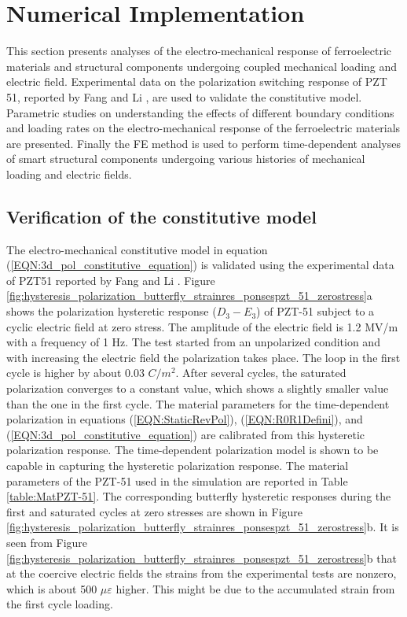 \section{Numerical Implementation}
This section presents analyses of the electro-mechanical response of ferroelectric materials and structural components undergoing coupled mechanical loading and electric field. 
Experimental data on the polarization switching response of PZT 51, reported by Fang and Li \cite{Li2004959}, are used to validate the constitutive model. 
Parametric studies on understanding the effects of different boundary conditions and loading rates on the electro-mechanical response of the ferroelectric materials are presented. 
Finally the FE method is used to perform time-dependent analyses of smart structural components undergoing various histories of mechanical loading and electric fields.

\subsection{Verification of the constitutive model} 
The electro-mechanical constitutive model in equation (\ref{EQN:3d_pol_constitutive_equation}) is validated using the experimental data of PZT51 reported by Fang and Li \cite{Li2004959}. 
Figure \ref{fig:hysteresis_polarization_butterfly_strainres_ponsespzt_51_zerostress}a shows the polarization hysteretic response ($D_3-E_3$) of PZT-51 subject to a cyclic electric field at zero stress. 
The amplitude of the electric field is 1.2 MV/m with a frequency of 1 Hz. 
The test started from an unpolarized condition and with increasing the electric field the polarization takes place. 
The loop in the first cycle is higher by about 0.03 $C/m^2$. 
After several cycles, the saturated polarization converges to a constant value, which shows a slightly smaller value than the one in the first cycle. 
The material parameters for the time-dependent polarization in equations (\ref{EQN:StaticRevPol}), (\ref{EQN:R0R1Defini}), and (\ref{EQN:3d_pol_constitutive_equation}) are calibrated from this hysteretic polarization response. 
The time-dependent polarization model is shown to be capable in capturing the hysteretic polarization response. 
The material parameters of the PZT-51 used in the simulation are reported in Table \ref{table:MatPZT-51}. 
The corresponding butterfly hysteretic responses during the first and saturated cycles at zero stresses are shown in Figure \ref{fig:hysteresis_polarization_butterfly_strainres_ponsespzt_51_zerostress}b. 
It is seen from Figure \ref{fig:hysteresis_polarization_butterfly_strainres_ponsespzt_51_zerostress}b that at the coercive electric fields the strains from the experimental tests are nonzero, which is about 500 $\mu \varepsilon$ higher. 
This might be due to the accumulated strain from the first cycle loading. 

